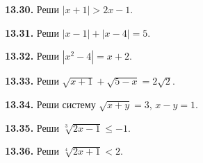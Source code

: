 \noindent\begin{minipage}[t]{\linewidth}\textbf{13.30.}\starmark{} Реши \(|x+1|>2x-1\).\par\end{minipage}\par
\noindent\begin{minipage}[t]{\linewidth}\textbf{13.31.} Реши \(|x-1|+|x-4|=5\).\par\end{minipage}\par
\noindent\begin{minipage}[t]{\linewidth}\textbf{13.32.}\starmark{} Реши \(|x^2-4|=x+2\).\par\end{minipage}\par
\noindent\begin{minipage}[t]{\linewidth}\textbf{13.33.}\starmark{} Реши \(\sqrt{x+1}+\sqrt{5-x}=2\sqrt2\).\par\end{minipage}\par
\noindent\begin{minipage}[t]{\linewidth}\textbf{13.34.} Реши систему \(\sqrt{x+y}=3\), \(x-y=1\).\par\end{minipage}\par
\noindent\begin{minipage}[t]{\linewidth}\textbf{13.35.} Реши \(\sqrt[3]{2x-1}\leq-1\).\par\end{minipage}\par
\noindent\begin{minipage}[t]{\linewidth}\textbf{13.36.}\starmark{} Реши \(\sqrt[4]{2x+1}<2\).\par\end{minipage}\par
\endgroup
